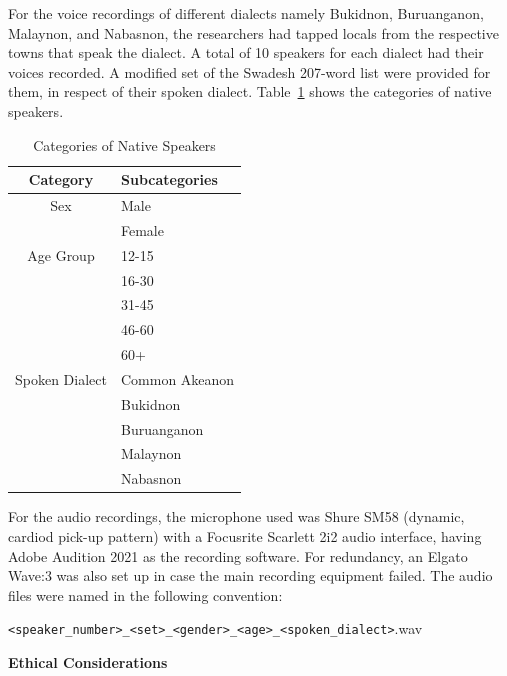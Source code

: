 For the voice recordings of different dialects namely Bukidnon, Buruanganon, Malaynon, and Nabasnon, the researchers had tapped locals from the respective towns that speak the dialect. A total of 10 speakers for each dialect had their voices recorded. A modified set of the Swadesh 207-word list were provided for them, in respect of their spoken dialect. Table~\ref{tab:native_speakers} shows the categories of native speakers. 

\begin{table}[H]
   \centering
   \caption{Categories of Native Speakers} \vspace{0.25em}
   \label{tab:native_speakers}
   \renewcommand{\arraystretch}{1.5} %
   \setlength{\tabcolsep}{10pt} %

\begin{tabular}{|c|p{2in}|} \hline
   \centering Category & Subcategories \\ \hline
   Sex & Male \\ 
   & Female \\ 
   \hline
   Age Group & 
   12-15 \\ 
   & 16-30 \\ 
   & 31-45 \\ 
   & 46-60 \\
   & 60+ \\ \hline
   Spoken Dialect & 
   Common Akeanon \\ 
   & Bukidnon \\ 
   & Buruanganon \\ 
   & Malaynon \\ 
   & Nabasnon \\ \hline
\end{tabular}
\end{table}

For the audio recordings, the microphone used was Shure SM58 (dynamic, cardiod pick-up pattern) with a Focusrite Scarlett 2i2 audio interface, having Adobe Audition 2021 as the recording software. For redundancy, an Elgato Wave:3 was also set up in case the main recording equipment failed. The audio files were named in the following convention: 

\texttt{\textless speaker\_number\textgreater\_\textless set\textgreater\_\textless gender\textgreater\_\textless age\textgreater\_\textless spoken\_dialect\textgreater}.wav

\textbf{Ethical Considerations}

